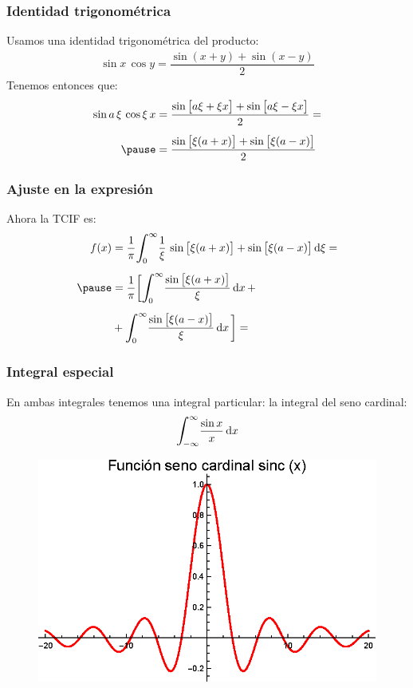 \documentclass[12pt]{beamer}
\begin{document}
\begin{frame}
\frametitle{Identidad trigonométrica}
Usamos una identidad trigonométrica del producto:
\pause
\begin{align*}
\sin x \, \cos y = \dfrac{\sin (x + y) + \sin (x - y)}{2}
\end{align*}
\pause
Tenemos entonces que:
\begin{eqnarray*}
\begin{aligned}
\sin a \, \xi \, \cos \xi \, x &= \dfrac{\sin \big[ a \xi + \xi x \big] + \sin \big[ a \xi - \xi x \big]}{2} = \\[0.5em] \pause
&= \dfrac{\sin \big[ \xi (a + x) \big] + \sin \big[ \xi (a - x) \big]}{2}
\end{aligned}
\end{eqnarray*}
\end{frame}
\begin{frame}
\frametitle{Ajuste en la expresión}
Ahora la TCIF es:
\pause
\begin{eqnarray*}
\begin{aligned}
f (x) &= \dfrac{1}{\pi} \scaleint{6ex}_{\bs 0}^{\infty} \dfrac{1}{\xi} \, \sin \big[ \xi (a + x) \big] + \sin \big[ \xi (a - x) \big] \dd{\xi} = \\[0.5em] \pause
&= \dfrac{1}{\pi} \bigg[ \scaleint{6ex}_{\bs 0}^{\infty} \dfrac{\sin \big[ \xi (a + x) \big]}{\xi} \dd{x} + \\[0.5em] 
&+ \scaleint{6ex}_{\bs 0}^{\infty} \dfrac{\sin \big[ \xi (a - x) \big]}{\xi} \dd{x} \bigg] =
\end{aligned}
\end{eqnarray*}
\end{frame}
\begin{frame}
\frametitle{Integral especial}
\begin{minipage}{0.5\linewidth}
En ambas integrales tenemos una integral particular: \pause la integral del seno cardinal:
\pause
\begin{align*}
\scaleint{6ex}_{\bs -\infty}^{\infty} \dfrac{\sin x}{x} \dd{x}
\end{align*}
\end{minipage}
\pause
\begin{minipage}{0.4\linewidth}
\begin{figure}
  \centering
  \includegraphics[scale=0.6]{Imagenes/Plot_Fourier_Ejercicios_02_sinc_x.eps}
\end{figure}
\end{minipage}
\end{frame}
\end{document}

